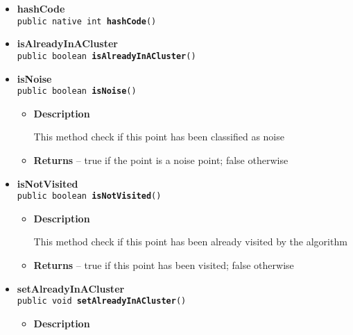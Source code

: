 {{{{{{\begin{itemize}
{\begin{itemize}
{This method returns the coordinate for this point
}
\item{{\bf  Returns} -- 
the coordinate for this point 
}%
\end{itemize}
}%
\item{ 
\hypertarget{it.unisa.sesa.repominer.dbscan.ChangePoint.hashCode()}{{\bf  hashCode}\\}
\texttt{public native int\ {\bf  hashCode}()
\label{it.unisa.sesa.repominer.dbscan.ChangePoint.hashCode()}}%
}%
\item{ 
\hypertarget{it.unisa.sesa.repominer.dbscan.ChangePoint.isAlreadyInACluster()}{{\bf  isAlreadyInACluster}\\}
\texttt{public boolean\ {\bf  isAlreadyInACluster}()
\label{it.unisa.sesa.repominer.dbscan.ChangePoint.isAlreadyInACluster()}}%
}%
\item{ 
\hypertarget{it.unisa.sesa.repominer.dbscan.ChangePoint.isNoise()}{{\bf  isNoise}\\}
\texttt{public boolean\ {\bf  isNoise}()
\label{it.unisa.sesa.repominer.dbscan.ChangePoint.isNoise()}}%
\begin{itemize}
\item{
{\bf  Description}

This method check if this point has been classified as noise
}
\item{{\bf  Returns} -- 
true if the point is a noise point; false otherwise 
}%
\end{itemize}
}%
\item{ 
\hypertarget{it.unisa.sesa.repominer.dbscan.ChangePoint.isNotVisited()}{{\bf  isNotVisited}\\}
\texttt{public boolean\ {\bf  isNotVisited}()
\label{it.unisa.sesa.repominer.dbscan.ChangePoint.isNotVisited()}}%
\begin{itemize}
\item{
{\bf  Description}

This method check if this point has been already visited by the algorithm
}
\item{{\bf  Returns} -- 
true if this point has been visited; false otherwise 
}%
\end{itemize}
}%
\item{ 
\hypertarget{it.unisa.sesa.repominer.dbscan.ChangePoint.setAlreadyInACluster()}{{\bf  setAlreadyInACluster}\\}
\texttt{public void\ {\bf  setAlreadyInACluster}()
\label{it.unisa.sesa.repominer.dbscan.ChangePoint.setAlreadyInACluster()}}%
\begin{itemize}
\item{
{\bf  Description}

}
\end{itemize}}
\end{itemize}}}}}}}
